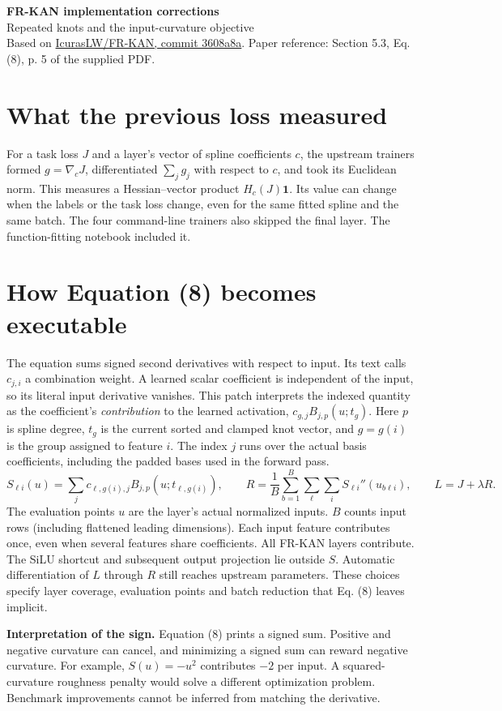 \documentclass[11pt]{article}
\begin{document}
{\Large\bfseries FR-KAN implementation corrections}\\[3pt]
{\large Repeated knots and the input-curvature objective}\\
Based on \href{https://github.com/IcurasLW/FR-KAN/tree/3608a8aa44575fac587bc5ab6cff303da05cc166}{IcurasLW/FR-KAN, commit 3608a8a}. Paper reference: Section 5.3, Eq. (8), p. 5 of the supplied PDF.
\section*{What the previous loss measured}
For a task loss $J$ and a layer's vector of spline coefficients $c$, the upstream trainers formed $g=\nabla_c J$, differentiated $\sum_j g_j$ with respect to $c$, and took its Euclidean norm. This measures a Hessian--vector product $H_c(J)\mathbf{1}$. Its value can change when the labels or the task loss change, even for the same fitted spline and the same batch. The four command-line trainers also skipped the final layer. The function-fitting notebook included it.
\section*{How Equation (8) becomes executable}
The equation sums signed second derivatives with respect to input. Its text calls $c_{j,i}$ a combination weight. A learned scalar coefficient is independent of the input, so its literal input derivative vanishes. This patch interprets the indexed quantity as the coefficient's \emph{contribution} to the learned activation, $c_{g,j}B_{j,p}(u; t_g)$. Here $p$ is spline degree, $t_g$ is the current sorted and clamped knot vector, and $g=g(i)$ is the group assigned to feature $i$. The index $j$ runs over the actual basis coefficients, including the padded bases used in the forward pass.
\[
 S_{\ell i}(u)=\sum_j c_{\ell,g(i),j} B_{j,p}(u;t_{\ell,g(i)}),\qquad
 R=\frac{1}{B}\sum_{b=1}^{B}\sum_\ell\sum_i
 S_{\ell i}''(u_{b\ell i}),\qquad L=J+\lambda R.
\]
The evaluation points $u$ are the layer's actual normalized inputs. $B$ counts input rows (including flattened leading dimensions). Each input feature contributes once, even when several features share coefficients. All FR-KAN layers contribute. The SiLU shortcut and subsequent output projection lie outside $S$. Automatic differentiation of $L$ through $R$ still reaches upstream parameters. These choices specify layer coverage, evaluation points and batch reduction that Eq. (8) leaves implicit.

\textbf{Interpretation of the sign.} Equation (8) prints a signed sum. Positive and negative curvature can cancel, and minimizing a signed sum can reward negative curvature. For example, $S(u)=-u^2$ contributes $-2$ per input. A squared-curvature roughness penalty would solve a different optimization problem. Benchmark improvements cannot be inferred from matching the derivative.
\newpage
\end{document}
